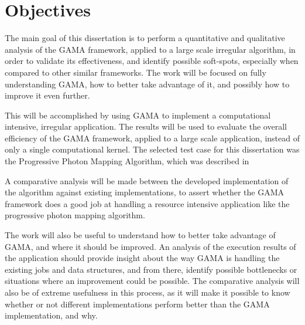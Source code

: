 \section{Objectives}

The main goal of this dissertation is to perform a quantitative and qualitative analysis of the GAMA framework, applied to a large scale irregular algorithm, in order to validate its effectiveness, and identify possible soft-spots, especially when compared to other similar frameworks. The work will be focused on fully understanding GAMA, how to better take advantage of it, and possibly how to improve it even further. 

This will be accomplished by using GAMA to implement a computational intensive, irregular application. The results will be used to evaluate the overall efficiency of the GAMA framework, applied to a large scale application, instead of only a single computational kernel. The selected test case for this dissertation was the Progressive Photon Mapping Algorithm, which was described in 

A comparative analysis will be made between the developed implementation of the algorithm against existing implementations, to assert whether the GAMA framework does a good job at handling a resource intensive application like the progressive photon mapping algorithm.

The work will also be useful to understand how to better take advantage of GAMA, and where it should be improved. An analysis of the execution results of the application should provide insight about the way GAMA is handling the existing jobs and data structures, and from there, identify possible bottlenecks or situations where an improvement could be possible.
The comparative analysis will also be of extreme usefulness in this process, as it will make it possible to know whether or not different implementations perform better than the GAMA implementation, and why. 
